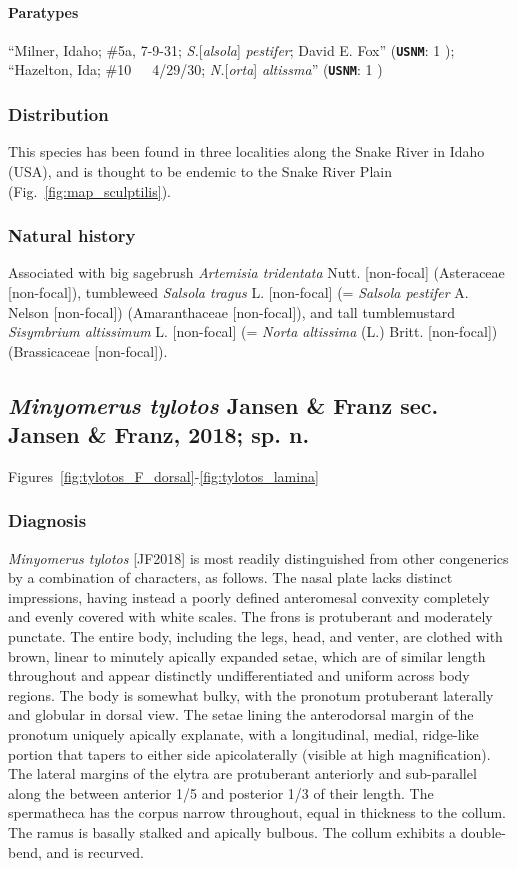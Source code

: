 \documentclass[fleqn,10pt,lineno]{wlpeerj} %
\begin{document}
			\paragraph{Paratypes}
				``Milner, Idaho; \#5a, 7-9-31; \textit{S.}[\textit{alsola}] \textit{pestifer}; David E. Fox'' (\texttt{\textbf{USNM}}: 1 \female);
				``Hazelton, Ida; \#10~~~4/29/30; \textit{N.}[\textit{orta}] \textit{altissma}'' (\texttt{\textbf{USNM}}: 1 \male)
		\subsubsection*{Distribution}
			This species has been found in three localities along the Snake River in Idaho (USA), and is thought to be endemic to the Snake River Plain (Fig.~\ref{fig:map_sculptilis}).
		\subsubsection*{Natural history}
			Associated with big sagebrush \textit{Artemisia tridentata} Nutt. [non-focal] (Asteraceae [non-focal]), tumbleweed \textit{Salsola tragus} L. [non-focal] (= \textit{Salsola pestifer} A. Nelson [non-focal]) (Amaranthaceae [non-focal]), and tall tumblemustard \textit{Sisymbrium altissimum} L. [non-focal] (= \textit{Norta altissima} (L.) Britt. [non-focal]) (Brassicaceae [non-focal]).

	\subsection*{\textit{Minyomerus tylotos} Jansen \& Franz sec. Jansen \& Franz, 2018; sp. n.}\label{ssec:tylotos}
		Figures~\ref{fig:tylotos_F_dorsal}-\ref{fig:tylotos_lamina}
		\subsubsection*{Diagnosis}
			\textit{Minyomerus tylotos} [JF2018] is most readily distinguished from other congenerics by a combination of characters, as follows.
			The nasal plate lacks distinct impressions, having instead a poorly defined anteromesal convexity completely and evenly covered with white scales.
			The frons is protuberant and moderately punctate.
			The entire body, including the legs, head, and venter, are clothed with brown, linear to minutely apically expanded setae, which are of similar length throughout and appear distinctly undifferentiated and uniform across body regions.
			The body is somewhat bulky, with the pronotum protuberant laterally and globular in dorsal view.
			The setae lining the anterodorsal margin of the pronotum uniquely apically explanate, with a longitudinal, medial, ridge-like portion that tapers to either side apicolaterally (visible at high magnification).
			The lateral margins of the elytra are protuberant anteriorly and sub-parallel along the between anterior 1/5 and posterior 1/3 of their length.
			The spermatheca has the corpus narrow throughout, equal in thickness to the collum.
			The ramus is basally stalked and apically bulbous.
			The collum exhibits a double-bend, and is recurved.
\end{document}
